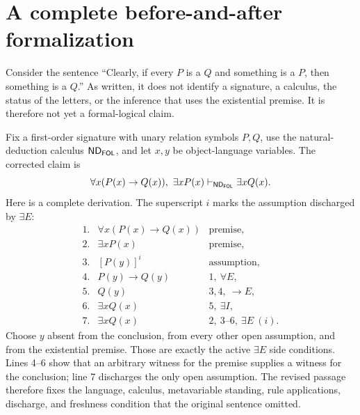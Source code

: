 \section{A complete before-and-after formalization}
\label{sec:latex-style-before-after}

Consider the sentence ``Clearly, if every \(P\) is a \(Q\) and something is a
\(P\), then something is a \(Q\).''  As written, it does not identify a
signature, a calculus, the status of the letters, or the inference that uses the
existential premise.  It is therefore not yet a formal-logical claim.

Fix a first-order signature with unary relation symbols \(P,Q\), use the
natural-deduction calculus \(\mathsf{ND}_{\mathsf{FOL}}\), and let \(x,y\) be object-language
variables.  The corrected claim is
\[
  \forall x(P(x)\to Q(x)),\ \exists xP(x)
  \vdash_{\mathsf{ND}_{\mathsf{FOL}}} \exists xQ(x).
\]
Here is a complete derivation.  The superscript \(i\) marks the assumption
discharged by \(\exists E\):
\[
\begin{array}{rll}
1.&\forall x(P(x)\to Q(x))&\text{premise},\\
2.&\exists xP(x)&\text{premise},\\
3.&[P(y)]^i&\text{assumption},\\
4.&P(y)\to Q(y)&1,\ \forall E,\\
5.&Q(y)&3,4,\ \to E,\\
6.&\exists xQ(x)&5,\ \exists I,\\
7.&\exists xQ(x)&2,\ 3\text{--}6,\ \exists E\ (i).
\end{array}
\]
Choose \(y\) absent from the conclusion, from every other open assumption, and
from the existential premise.  Those are exactly the active
\(\exists E\) side conditions.  Lines 4--6 show that an arbitrary witness for
the premise supplies a witness for the conclusion; line 7 discharges the only
open assumption.  The revised passage therefore fixes the language,
calculus, metavariable standing, rule applications, discharge, and freshness
condition that the original sentence omitted.


